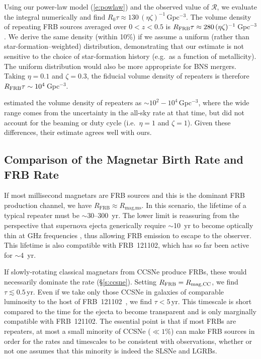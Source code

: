 \documentclass[twocolumn]{aastex6}
\newcommand{\apx}{\ensuremath{\sim}}
\newcommand{\repeater}{FRB~121102}
\begin{document}
Using our power-law model (\autoref{e:powlaw}) and the observed value of $\mathcal{R}$, we evaluate the integral numerically and find $R_0 \tau \approx 130\, (\eta \zeta)^{-1}$\,Gpc$^{-3}$. The volume density of repeating FRB sources averaged over $0 < z < 0.5$ is $R_{\rm FRB}\tau \approx 280\, (\eta \zeta)^{-1}$\,Gpc$^{-3}$. We derive the same density (within 10\%) if we assume a uniform (rather than star-formation--weighted) distribution, demonstrating that our estimate is not sensitive to the choice of star-formation history (e.g.~as a function of metallicity). The uniform distribution would also be more appropriate for BNS mergers. Taking $\eta = 0.1$ and $\zeta = 0.3$, the fiducial volume density of repeaters is therefore $R_{\rm FRB} \tau \sim 10^4$\,Gpc$^{-3}$.

\citet{lu2016} estimated the volume density of repeaters as $\sim 10^2-10^4$\,Gpc$^{-3}$, where the wide range comes from the uncertainty in the all-sky rate at that time, but did not account for the beaming or duty cycle (i.e.~$\eta=1$ and $\zeta=1$). Given these differences, their estimate agrees well with ours.

\subsection{Comparison of the Magnetar Birth Rate and FRB Rate}

If most millisecond magnetars are FRB sources and this is the dominant FRB production channel, we have $R_\text{FRB} \approx R_\text{mag,ms}$. In this scenario, the lifetime of a typical repeater must be \apx30--300~yr.  The lower limit is reassuring from the perspective that supernova ejecta generically require \apx10~yr to become optically thin at GHz frequencies \citep{mbm.2017}, thus allowing FRB emission to escape to the observer. This lifetime is also compatible with \repeater, which has so far been active for \apx4~yr.

If slowly-rotating classical magnetars from CCSNe produce FRBs, these would necessarily dominate the rate (\S\ref{s:ccsne}). Setting $R_{\rm FRB} = R_{\rm mag,CC}$, we find $\tau \lesssim 0.5$\,yr. Even if we take only those CCSNe in galaxies of comparable luminosity to the host of \repeater\ \citep{sve2010}, we find $\tau < 5$\,yr. This timescale is short compared to the time for the ejecta to become transparent and is only marginally compatible with \repeater. The essential point is that if most FRBs are repeaters, at most a small minority of CCSNe ($\ll 1$\%) can make FRB sources in order for the rates and timescales to be consistent with observations, whether or not one assumes that this minority is indeed the SLSNe and LGRBs.
\end{document}
